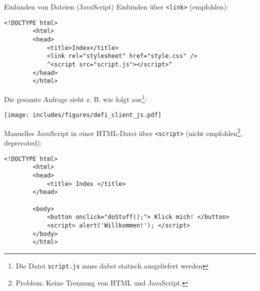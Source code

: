 \begin{example}{Einbinden von Dateien (JavaScript)}
    Einbinden über \texttt{<link>} (empfohlen):
    \begin{lstlisting}[language=HTML5]
        <!DOCTYPE html>
        <html>
        <head>
            <title>Index</title>
            <link rel="stylesheet" href="style.css" />
            ^<script src="script.js"></script>^
        </head>
        </html>
    \end{lstlisting}

    Die gesamte Anfrage sieht z. B. wie folgt aus\footnote{Die Datei \texttt{script.js} muss dabei statisch ausgeliefert werden}:

    \begin{center}
        \texttt{[image: includes/figures/defi\_client\_js.pdf]}
    \end{center}

    Manuelles JavaScript in einer HTML-Datei über \texttt{<script>} (nicht empfohlen\footnote{Problem: Keine Trennung von HTML und JavaScript.}, deprecated):
    \begin{lstlisting}[language=HTML5]
        <!DOCTYPE html>
        <html>
        <head>
            <title> Index </title>
        </head>

        <body>
            <button onclick="doStuff();"> Klick mich! </button>
            <script> alert('Willkommen!'); </script>
        </body>
        </html>
    \end{lstlisting}
\end{example}

